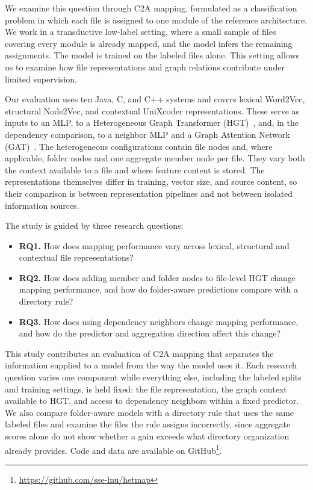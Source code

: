 We examine this question through C2A mapping, formulated as a classification problem in which each file is assigned to one module of the reference architecture. We work in a transductive low-label setting, where a small sample of files covering every module is already mapped, and the model infers the remaining assignments. The model is trained on the labeled files alone. This setting allows us to examine how file representations and graph relations contribute under limited supervision.

Our evaluation uses ten Java, C, and C++ systems and covers lexical Word2Vec, structural Node2Vec, and contextual UniXcoder representations. These serve as inputs to an MLP, to a Heterogeneous Graph Transformer (HGT)~\cite{hgt}, and, in the dependency comparison, to a neighbor MLP and a Graph Attention Network (GAT)~\cite{gat}. The heterogeneous configurations contain file nodes and, where applicable, folder nodes and one aggregate member node per file. They vary both the context available to a file and where feature content is stored. The representations themselves differ in training, vector size, and source content, so their comparison is between representation pipelines and not between isolated information sources.

\noindent The study is guided by three research questions:
\begin{itemize}[leftmargin=1em, itemsep=1pt]
    \item \textbf{RQ1.} How does mapping performance vary across lexical, structural and contextual file representations?
    \item \textbf{RQ2.} How does adding member and folder nodes to file-level HGT change mapping performance, and how do folder-aware predictions compare with a directory rule?
    \item \textbf{RQ3.} How does using dependency neighbors change mapping performance, and how do the predictor and aggregation direction affect this change?
\end{itemize}
 
This study contributes an evaluation of C2A mapping that separates the information supplied to a model from the way the model uses it. Each research question varies one component while everything else, including the labeled splits and training settings, is held fixed: the file representation, the graph context available to HGT, and access to dependency neighbors within a fixed predictor. We also compare folder-aware models with a directory rule that uses the same labeled files and examine the files the rule assigns incorrectly, since aggregate scores alone do not show whether a gain exceeds what directory organization already provides. Code and data are available on GitHub\footnote{\label{fn:code}\url{https://github.com/sse-lnu/hetmap}}.
